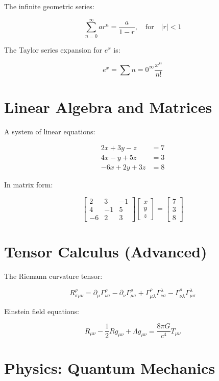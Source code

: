 \documentclass{article}
\begin{document}
The infinite geometric series:

\[
\sum_{n=0}^{\infty} ar^n = \frac{a}{1-r}, \quad \text{for} \quad |r| < 1
\]

The Taylor series expansion for \( e^x \) is:

\[
e^x = \sum{n=0}^{\infty} \frac{x^n}{n!}
\]

\section{Linear Algebra and Matrices}

A system of linear equations:

\[
\begin{aligned}
2x + 3y - z &= 7 \\
4x - y + 5z &= 3 \\
-6x + 2y + 3z &= 8
\end{aligned}
\]

In matrix form:

\[
\begin{bmatrix}
2 & 3 & -1 \\
4 & -1 & 5 \\
-6 & 2 & 3
\end{bmatrix}
\begin{bmatrix}
x \\ y \\ z
\end{bmatrix}
=
\begin{bmatrix}
7 \\ 3 \\ 8
\end{bmatrix}
\]

\section{Tensor Calculus (Advanced)}

The Riemann curvature tensor:

\[
R^\rho_{\sigma\mu\nu} = \partial_\mu \Gamma^\rho_{\nu\sigma} - \partial_\nu \Gamma^\rho_{\mu\sigma} + \Gamma^\rho_{\mu\lambda} \Gamma^\lambda_{\nu\sigma} - \Gamma^\rho_{\nu\lambda} \Gamma^\lambda_{\mu\sigma}
\]

Einstein field equations:

\[
R_{\mu\nu} - \frac{1}{2} R g_{\mu\nu} + \Lambda g_{\mu\nu} = \frac{8\pi G}{c^4} T_{\mu\nu}
\]

\section{Physics: Quantum Mechanics}
\end{document}
